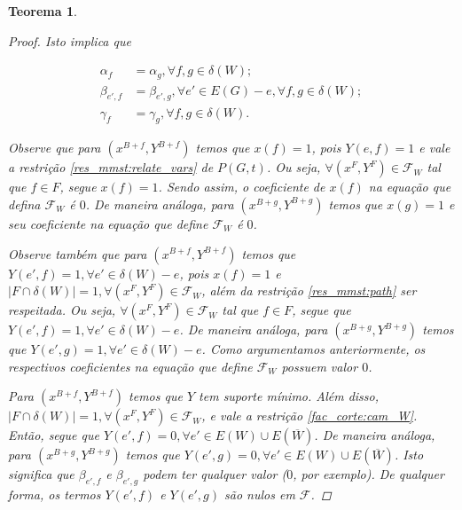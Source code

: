 \documentclass[11pt,reqno]{amsart}
\newtheorem{teorema}{Teorema}
\newcommand{\incid}{\mathcal{X}}
\newcommand{\incidY}{\mathcal{Y}}
\newcommand{\facetF}{\mathcal{F}}
\begin{document}
\begin{teorema}
\begin{proof}
Isto implica que

\begin{equation*}
\begin{split}
\alpha_{f} &= \alpha_{g}, \forall f,g \in \delta(W);\\
\beta_{e',f} &= \beta_{e',g}, \forall e' \in E(G)-e, \forall f,g \in \delta(W);\\
\gamma_{f} &= \gamma_{g}, \forall f,g \in \delta(W).
\end{split}
\end{equation*}


Observe que para $(x^{B+f},Y^{B+f})$ 
temos que $x(f) = 1$, pois $Y(e,f) = 1$ e vale a 
restrição \ref{res_mmst:relate_vars} de $P(G,t)$. 
Ou seja, $\forall (x^{F},Y^{F}) \in \facetF_W$ tal que $f \in F$, 
segue $x(f) = 1$. Sendo assim, o coeficiente de $x(f)$ na equação que defina 
$\facetF_{W}$ é $0$.
 De maneira análoga, para $(x^{B+g},Y^{B+g})$ temos que $x(g) = 1$ e 
seu coeficiente na equação que define $\facetF_{W}$ é $0$.

Observe também que para $(x^{B+f},Y^{B+f})$ 
temos que $Y(e',f) = 1, \forall e' \in \delta(W) - e$, pois $x(f) = 1$ e 
$|F \cap \delta(W)| = 1, \forall (x^{F},Y^{F}) \in \facetF_W$, 
além da restrição \ref{res_mmst:path} ser respeitada. 
Ou seja, $\forall (x^{F},Y^{F}) \in \facetF_W$ tal que $f \in F$, 
segue que $Y(e',f) = 1, \forall e' \in \delta(W) - e$. 
De maneira análoga, para $(x^{B+g},Y^{B+g})$ 
temos que $Y(e',g) = 1, \forall e' \in \delta(W) - e$. Como argumentamos 
anteriormente, os respectivos coeficientes na equação que define $\facetF_{W}$ 
possuem valor $0$.

Para $(x^{B+f},Y^{B+f})$ temos que $Y$ tem suporte mínimo. 
Além disso, $|F \cap \delta(W)| = 1, \forall (x^{F},Y^{F}) \in \facetF_W$, e 
vale a restrição \ref{fac_corte:cam_W}. Então, segue que 
$Y(e',f) = 0, \forall e' \in E(W) \cup E(\overline{W})$. De maneira análoga, 
para $(x^{B+g},Y^{B+g})$ 
temos que $Y(e',g) = 0, \forall e' \in E(W) \cup E(\overline{W})$. 
Isto significa que $\beta_{e',f}$ e $\beta_{e',g}$ podem ter qualquer valor 
($0$, por exemplo). De qualquer forma, os termos $Y(e',f)$ e $Y(e',g)$ são 
nulos em $\facetF$.



\end{proof}
\end{teorema}
\end{document}
